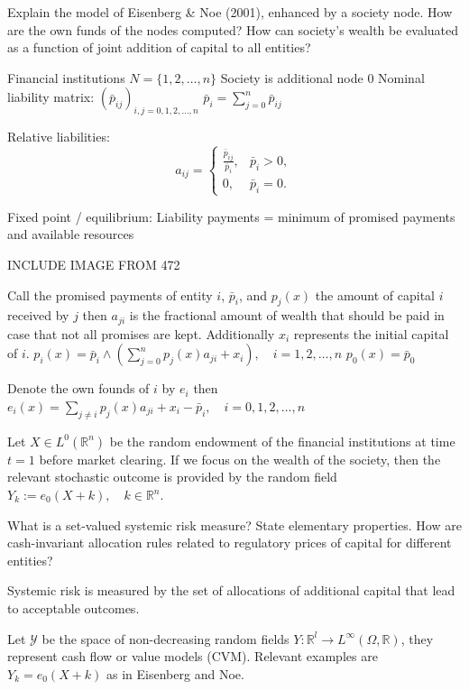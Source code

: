 Explain the model of Eisenberg \& Noe (2001), enhanced by a society node. How
are the own funds of the nodes computed? How can society’s wealth be evaluated
as a function of joint addition of capital to all entities?


Financial institutions \( N = \{ 1, 2, \ldots, n \} \)
Society is additional node \( 0 \)
Nominal liability matrix: \( (\bar{p}_{ij})_{i,j=0,1,2,\ldots,n} \)
\(
\bar{p}_i = \sum_{j=0}^{n} \bar{p}_{ij}
\)

Relative liabilities:
\[
a_{ij} = 
\begin{cases} 
\frac{\bar{p}_{ij}}{\bar{p}_i}, & \bar{p}_i > 0, \\ 
0, & \bar{p}_i = 0.
\end{cases}
\]

Fixed point / equilibrium:
Liability payments
=
minimum of promised payments and
available resources

INCLUDE IMAGE FROM 472

Call the promised payments of entity \( i \), \( \bar{p}_i \), and \( p_j(x) \) the amount of capital \( i \) received by \( j \)
then \( a_{ji} \) is the fractional amount of wealth that should be paid in case that not all promises are kept.
Additionally \( x_i \) represents the initial capital of \( i \).
\(p_i(x) = \bar{p}_i \wedge \left( \sum_{j=0}^n p_j(x) a_{ji} + x_i \right), \quad i = 1, 2, \ldots, n \)
\( p_0(x) = \bar{p}_0 \)

Denote the own founds of \( i \) by \( e_i \) then
\( e_i(x) = \sum_{j \neq i} p_j(x) a_{ji} + x_i - \bar{p}_i, \quad i = 0, 1, 2, \ldots, n \)

Let \( X \in L^0(\mathbb{R}^n) \) be the random endowment of the financial institutions at time \( t = 1 \) before market clearing.
If we focus on the wealth of the society, then the relevant stochastic outcome is provided by the random field
\( Y_k := e_0(X + k), \quad k \in \mathbb{R}^n. \)

What is a set-valued systemic risk measure? State elementary properties. How are
cash-invariant allocation rules related to regulatory prices of capital for different
entities?

Systemic risk is measured by the set of allocations of additional capital that lead to acceptable outcomes.

Let \( \mathcal{Y} \) be the space of non-decreasing random fields \( Y : \mathbb{R}^l \to L^\infty(\Omega, \mathbb{R}) \),
they represent cash flow or value models (CVM). Relevant examples are \( Y_k = e_0(X + k) \) as in Eisenberg and Noe. 

